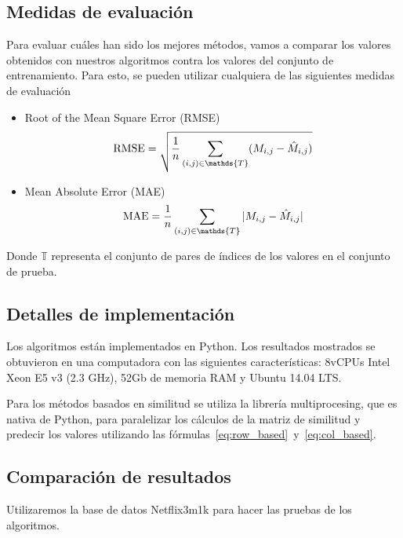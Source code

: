 \subsection{Medidas de evaluación}
Para evaluar cuáles han sido los mejores métodos, vamos a comparar los valores obtenidos con nuestros algoritmos contra los valores del conjunto de entrenamiento. Para esto, se pueden utilizar cualquiera de las siguientes medidas de evaluación
\begin{itemize}
    \item Root of the Mean Square Error (RMSE)
        \begin{equation}
            \RMSE = \sqrt{\frac{1}{n} \sum_{(i, j) \in \mathds{T}} (M_{i, j} - \hat M_{i, j})}
        \end{equation}
    \item Mean Absolute Error (MAE)
        \begin{equation}
            \MAE = \frac{1}{n} \sum_{(i, j) \in \mathds{T}} |M_{i, j} - \hat M_{i, j}|
        \end{equation}
\end{itemize}

Donde $\mathds{T}$ representa el conjunto de pares de índices de los valores en el conjunto de prueba.

\subsection{Detalles de implementación}
Los algoritmos están implementados en Python. Los resultados mostrados se obtuvieron en una computadora con las siguientes características: 8vCPUs Intel Xeon E5 v3 (2.3 GHz), 52Gb de memoria RAM y Ubuntu 14.04 LTS.

Para los métodos basados en similitud se utiliza la librería multiprocesing, que es nativa de Python, para paralelizar los cálculos de la matriz de similitud y predecir los valores utilizando las fórmulas~\ref{eq:row_based}~y~\ref{eq:col_based}.

\subsection{Comparación de resultados}
Utilizaremos la base de datos Netflix3m1k para hacer las pruebas de los algoritmos.

